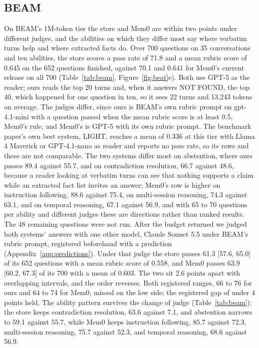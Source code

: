 \subsection{BEAM}
\label{sec:beam}

On BEAM's 1M-token tier the store and Mem0 are within two points under different judges, and the abilities on which they differ most say where verbatim turns help and where extracted facts do. Over 700 questions on 35 conversations and ten abilities, the store scores a pass rate of 71.8 and a mean rubric score of 0.645 on the 652 questions finished, against 70.1 and 0.641 for Mem0's current release on all 700 \citep{mem0benchmarks2026,beam2026} (Table~\ref{tab:beam}, Figure~\ref{fig:beat}e). Both use GPT-5 as the reader; ours reads the top 20 turns and, when it answers NOT FOUND, the top 40, which happened for one question in ten, so it sees 22 turns and 13,243 tokens on average. The judges differ, since ours is BEAM's own rubric prompt on gpt-4.1-mini with a question passed when the mean rubric score is at least 0.5, Mem0's rule, and Mem0's is GPT-5 with its own rubric prompt. The benchmark paper's own best system, LIGHT, reaches a mean of 0.336 at this tier with Llama 4 Maverick or GPT-4.1-nano as reader and reports no pass rate, so its rows and these are not comparable. The two systems differ most on abstention, where ours passes 89.4 against 55.7, and on contradiction resolution, 66.7 against 48.6, because a reader looking at verbatim turns can see that nothing supports a claim while an extracted fact list invites an answer; Mem0's row is higher on instruction following, 88.6 against 75.4, on multi-session reasoning, 74.3 against 63.1, and on temporal reasoning, 67.1 against 56.9, and with 65 to 70 questions per ability and different judges these are directions rather than ranked results. The 48 remaining questions were not run. After the budget returned we judged both systems' answers with one other model, Claude Sonnet 5.5 under BEAM's rubric prompt, registered beforehand with a prediction (Appendix~\ref{app:predictions}). Under that judge the store passes 61.3 [57.6, 65.0] of its 652 questions with a mean rubric score of 0.558, and Mem0 passes 63.9 [60.2, 67.3] of its 700 with a mean of 0.603. The two sit 2.6 points apart with overlapping intervals, and the order reverses. Both registered ranges, 66 to 76 for ours and 64 to 74 for Mem0, missed on the low side; the registered gap of under 4 points held. The ability pattern survives the change of judge (Table~\ref{tab:beam}): the store keeps contradiction resolution, 63.6 against 7.1, and abstention narrows to 59.1 against 55.7, while Mem0 keeps instruction following, 85.7 against 72.3, multi-session reasoning, 75.7 against 52.3, and temporal reasoning, 68.6 against 56.9.

